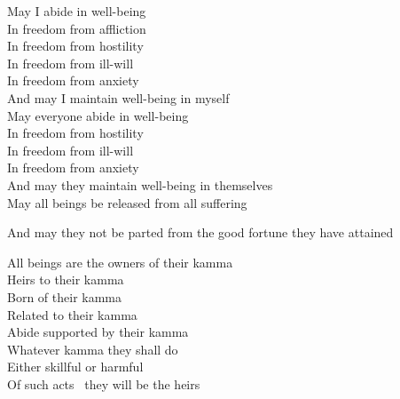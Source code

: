 \begin{english-verses}
  May I abide in well-being\\
  In freedom from affliction\\
  In freedom from hostility\\
  In freedom from ill-will\\
  In freedom from anxiety\\
  And may I maintain well-being in myself\\
  May everyone abide in well-being\\
  In freedom from hostility\\
  In freedom from ill-will\\
  In freedom from anxiety\\
  And may they maintain well-being in themselves\\
  May all beings be released from all suffering\\
\end{english-verses}
\begin{english-hang}
  And may they not be parted from the good fortune they have attained
\end{english-hang}
\begin{english-verses}
  All beings are the owners of their kamma\\
  Heirs to their kamma\\
  Born of their kamma\\
  Related to their kamma\\
  Abide supported by their kamma\\
  Whatever kamma they shall do\\
  Either skillful or harmful\\
  Of such acts \breathmark\ they will be the heirs\\
\end{english-verses}

